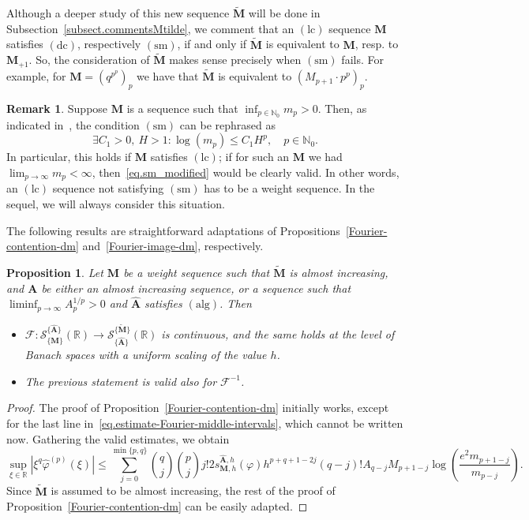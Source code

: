 \documentclass[12pt,a4paper]{article}
\newcommand{\N}{\mathbb{N}}
\newcommand{\R}{\mathbb{R}}
\newcommand{\M}{{\boldsymbol{M}}}
\newcommand{\A}{{\boldsymbol{A}}}
\newcommand{\hA}{\widehat{{\boldsymbol{A}}}}
\newcommand{\lc}{\operatorname{(lc)}}
\newcommand{\dc}{\operatorname{(dc)}}
\newcommand{\alg}{\operatorname{(alg)}}
\newcommand{\sm}{\operatorname{(sm)}}
\theoremstyle{plain}
\newtheorem{prop}[theorem]{Proposition}
\theoremstyle{definition}
\newtheorem{remark}[theorem]{Remark}
\numberwithin{equation}{section}
\begin{document}
Although a deeper study of this new sequence $\widetilde{\M}$ will be done in Subsection~\ref{subsect.commentsMtilde}, we comment that an $\lc$ sequence $\M$ satisfies $\dc$, respectively $\sm$, if and only if $\widetilde{\M}$ is equivalent to $\M$, resp. to $\M_{+1}$. So, the consideration of $\widetilde{\M}$ makes sense precisely when $\sm$ fails. For example, for $\M=(q^{p^p})_p$ we have that $\widetilde{\M}$ is equivalent to  $(M_{p+1}\cdot p^p)_p$.

\begin{remark}
Suppose $\M$ is a sequence such that $\inf_{p\in\N_0}m_p>0$. Then, as indicated in~\cite[Remark 2.4]{JimenezMiguelSanzSchindlSurjectSM}, the condition $\sm$ can be rephrased as
\begin{equation}\label{eq.sm_modified}
\exists C_1 > 0,\ H > 1\colon \log(m_p)\le C_1H^p,\quad p\in\N_0.
\end{equation}
In particular, this holds if $\M$ satisfies $\lc$; if for such an $\M$ we had $\lim_{p\to\infty}m_p<\infty$, then~\eqref{eq.sm_modified} would be clearly valid. In other words, an $\lc$ sequence not satisfying $\sm$ has to be a weight sequence. In the sequel, we will always consider this situation.
\end{remark}


The following results are straightforward adaptations of Propositions~\ref{Fourier-contention-dm} and~\ref{Fourier-image-dm}, respectively.

\begin{prop}\label{prop.Fourier-contention-sm}
Let $\M$ be a weight sequence such that $\widetilde{\M}$ is almost increasing, and $\A$ be either an almost increasing sequence, or a sequence such that $\liminf_{p\to\infty}A_p^{1/p}>0$ and $\hA$ satisfies $\alg$. Then
\begin{itemize}
\item[$(i)$] $\mathcal{F}\colon\mathcal{S}^{\{\hA\}}_{\{\M\}}(\R)\to \mathcal{S}^{\{\widetilde{\M}\}}_{\{\hA\}}(\R)$ is continuous,
and the same holds at the level of Banach spaces with a uniform scaling of the value $h$.
\item[$(ii)$] The previous statement is valid also for $\mathcal{F}^{-1}$.
\end{itemize}
\end{prop}

\begin{proof}
The proof of Proposition~\ref{Fourier-contention-dm} initially works, except for the last line in~\eqref{eq.estimate-Fourier-middle-intervals}, which cannot be written now. Gathering the valid estimates, we obtain
\begin{equation*}
\sup_{\xi \in \R} |\xi^q\widehat{\varphi}^{(p)}(\xi)|\leq \sum_{j=0}^{\min\{p,q\}} \binom{q}{j}\binom{p}{j} j! 2s_{\M,h}^{\hA,h}(\varphi)h^{p+q+1-2j}(q-j)!A_{q-j}M_{p+1-j}\log\left(\frac{e^2m_{p+1-j}}{m_{p-j}}\right).
\end{equation*}
Since $\widetilde{\M}$ is assumed to be almost increasing, the rest of the proof of Proposition~\ref{Fourier-contention-dm} can be easily adapted.
\end{proof}
\end{document}
